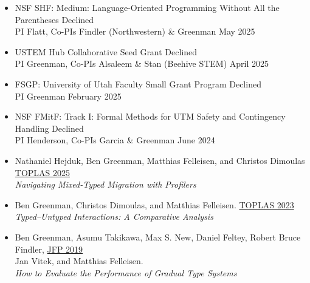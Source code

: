 \documentclass[11pt]{article}
\begin{document}
{\begin{itemize}
    \\ PI Greenman \hfill  August 2025 %
  \item NSF SHF: Medium: Language-Oriented Programming Without All the Parentheses \hfill Declined
    \\ PI Flatt, Co-PIs Findler (Northwestern) \& Greenman \hfill  May 2025 %
  \item USTEM Hub Collaborative Seed Grant \hfill Declined \\
    PI Greenman, Co-PIs Alsaleem \& Stan (Beehive STEM) \hfill April 2025
  \item FSGP: University of Utah Faculty Small Grant Program \hfill Declined
    \\ PI Greenman \hfill February 2025
  \item NSF FMitF: Track I: Formal Methods for UTM Safety and Contingency Handling \hfill Declined
    \\ PI Henderson, Co-PIs Garcia \& Greenman \hfill  June 2024 %
\end{itemize}
}




\begin{itemize}
\item
  Nathaniel Hejduk, Ben Greenman, Matthias Felleisen, and Christos Dimoulas \hfill \href{https://dl.acm.org/doi/10.1145/3785004}{TOPLAS 2025} \\
  \emph{Navigating Mixed-Typed Migration with Profilers}
\item
  Ben Greenman, Christos Dimoulas, and Matthias Felleisen. \hfill \href{https://dl.acm.org/doi/10.1145/3579833}{TOPLAS 2023} \\
  \emph{Typed--Untyped Interactions: A Comparative Analysis}
\item
  Ben Greenman, Asumu Takikawa, Max S. New, Daniel Feltey, Robert Bruce Findler, \hfill \href{https://www.cambridge.org/core/journals/journal-of-functional-programming/article/abs/how-to-evaluate-the-performance-of-gradual-type-systems/DC765724C52A3A462F16C7FB3AD18697}{JFP 2019} \\
  Jan Vitek, and Matthias Felleisen. \\
  \emph{How to Evaluate the Performance of Gradual Type Systems}
\end{itemize}
\end{document}
